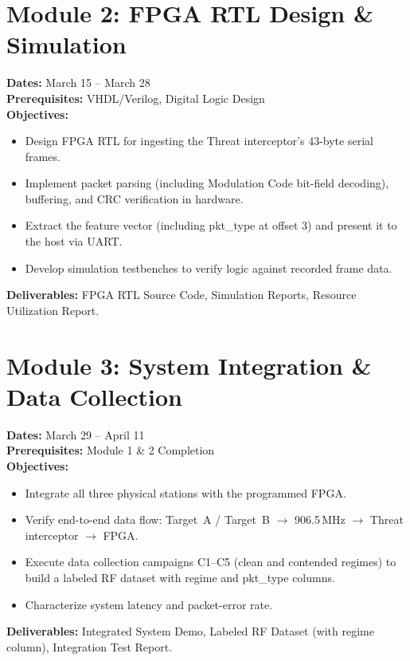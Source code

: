 \documentclass[11pt,letterpaper]{article}
\begin{document}
\section{Module 2: FPGA RTL Design \& Simulation}
\textbf{Dates:} March 15 -- March 28 \\
\textbf{Prerequisites:} VHDL/Verilog, Digital Logic Design \\
\textbf{Objectives:}
\begin{itemize}[noitemsep]
    \item Design FPGA RTL for ingesting the Threat interceptor's 43-byte serial frames.
    \item Implement packet parsing (including Modulation Code bit-field decoding), buffering, and CRC verification in hardware.
    \item Extract the feature vector (including pkt\_type at offset 3) and present it to the host via UART.
    \item Develop simulation testbenches to verify logic against recorded frame data.
\end{itemize}
\textbf{Deliverables:} FPGA RTL Source Code, Simulation Reports, Resource Utilization Report.

\newpage
\section{Module 3: System Integration \& Data Collection}
\textbf{Dates:} March 29 -- April 11 \\
\textbf{Prerequisites:} Module 1 \& 2 Completion \\
\textbf{Objectives:}
\begin{itemize}[noitemsep]
    \item Integrate all three physical stations with the programmed FPGA.
    \item Verify end-to-end data flow: Target~A / Target~B $\to$ 906.5\,MHz $\to$ Threat interceptor $\to$ FPGA.
    \item Execute data collection campaigns C1--C5 (clean and contended regimes) to build a labeled RF dataset with regime and pkt\_type columns.
    \item Characterize system latency and packet-error rate.
\end{itemize}
\textbf{Deliverables:} Integrated System Demo, Labeled RF Dataset (with regime column), Integration Test Report.
\end{document}
